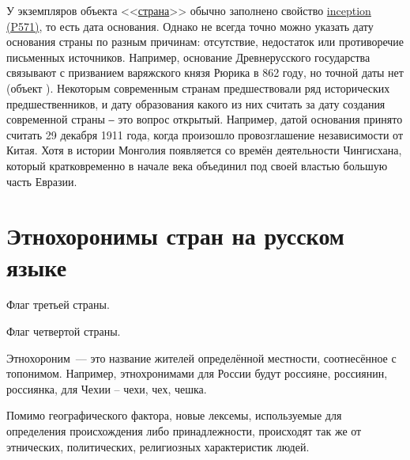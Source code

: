 У экземпляров объекта <<\href{https://www.wikidata.org/wiki/Q6256}{страна}>> обычно заполнено свойство \href{https://www.wikidata.org/wiki/Property:P571}{inception (P571)}, то есть дата основания. Однако не всегда точно можно  указать дату основания страны по разным причинам: отсутствие, недостаток или противоречие письменных источников. Например, основание Древнерусского государства связывают с призванием варяжского князя Рюрика в 862 году, но точной даты нет (объект ). Некоторым современным странам предшествовали ряд исторических предшественников, и дату образования какого из них считать за дату создания современной страны ‒ это вопрос открытый. Например, датой основания  принято считать 29 декабря 1911 года, когда произошло провозглашение независимости от Китая. Хотя в истории Монголия появляется со времён деятельности Чингисхана, который кратковременно в начале \MakeUppercase{} века объединил под своей властью большую часть Евразии.



\section{Этнохоронимы стран на русском языке}

\begin{marginfigure}[0.0cm]
	{
		\setlength{\fboxsep}{0pt}%
		\setlength{\fboxrule}{1pt}%
	}
	\caption{Флаг третьей страны.}%
	\label{fig:flag_israel}%
\end{marginfigure}
\begin{marginfigure}[0.0cm]
	{
		\setlength{\fboxsep}{0pt}%
		\setlength{\fboxrule}{1pt}%
	}
	\caption{Флаг четвертой страны.}%
	\label{fig:flag_mongolia}%
\end{marginfigure}

Этнохороним~--- это название жителей определённой местности, соотнесённое с топонимом. Например, этнохронимами для России будут россияне, россиянин, россиянка, для Чехии – чехи, чех, чешка.

Помимо географического фактора, новые лексемы, используемые для определения происхождения либо принадлежности, происходят так же от этнических, политических, религиозных характеристик людей\cite{Zhuravleva2012}. 

